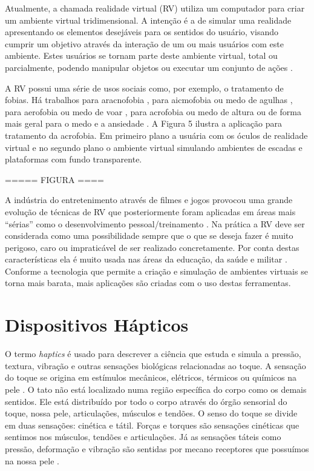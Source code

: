 Atualmente, a chamada realidade virtual (RV) utiliza um computador para criar um ambiente virtual tridimensional. A intenção é a de simular uma realidade apresentando os elementos desejáveis para os sentidos do usuário, visando cumprir um objetivo através da interação de um ou mais usuários com este ambiente. Estes usuários se tornam parte deste ambiente virtual, total ou parcialmente, podendo manipular objetos ou executar um conjunto de ações \cite{VRS2018}.

A RV possui uma série de usos sociais como, por exemplo, o tratamento de fobias. Há trabalhos para aracnofobia \cite{Carlin1997}, para aicmofobia ou medo de agulhas \cite{Galoustian2018}, para aerofobia ou medo de voar \cite{Rothbaum2006}, para acrofobia ou medo de altura \cite{Edwards2018} ou de forma mais geral para o medo e a ansiedade \cite{Goldman2017}. A Figura 5 ilustra a aplicação para tratamento da acrofobia. Em primeiro plano a usuária com os óculos de realidade virtual e no segundo plano o ambiente virtual simulando ambientes de escadas e plataformas com fundo transparente.

===== FIGURA ====

A indústria do entretenimento através de filmes e jogos provocou uma grande evolução de técnicas de RV que posteriormente foram aplicadas em áreas mais “sérias” como o desenvolvimento pessoal/treinamento \cite{Ma2011, Prensky2001, Smith2011}. Na prática a RV deve ser considerada como uma possibilidade sempre que o que se deseja fazer é muito perigoso, caro ou impraticável de ser realizado concretamente. Por conta destas características ela é muito usada nas áreas da educação, da saúde e militar \cite{VRS2018}. Conforme a tecnologia que permite a criação e simulação de ambientes virtuais se torna mais barata, mais aplicações são criadas com o uso destas ferramentas.

\section{Dispositivos Hápticos}

O termo \textit{haptics} é usado para descrever a ciência que estuda e simula a pressão, textura, vibração e outras sensações biológicas relacionadas ao toque. A sensação do toque se origina em estímulos mecânicos, elétricos, térmicos ou químicos na pele \cite{Burdea1996}. O tato não está localizado numa região específica do corpo como os demais sentidos. Ele está distribuído por todo o corpo através do órgão sensorial do toque, nossa pele, articulações, músculos e tendões. O senso do toque se divide em duas sensações: cinética e tátil. Forças e torques são sensações cinéticas que sentimos nos músculos, tendões e articulações. Já as sensações táteis como pressão, deformação e vibração são sentidas por mecano receptores que possuímos na nossa pele \cite{Culbertson2018}. 

